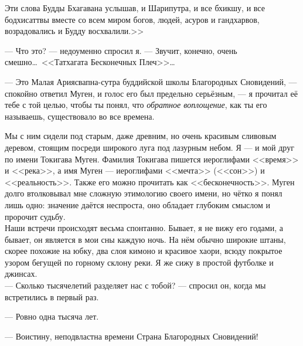 \documentclass[openany, oneside]{book}
\begin{document}
Эти слова Будды Бхагавана услышав, и Шарипутра, и все бхикшу, и все бодхисаттвы вместе со всем миром богов, людей, асуров и гандхарвов, возрадовались и Будду восхвалили.>>

--- Что это? --- недоуменно спросил я. --- Звучит, конечно, очень смешно\dots \ <<Татхагата Бесконечных Плеч>>\dots

--- Это Малая Ариясвапна-сутра буддийской школы Благородных Сновидений, --- спокойно ответил Муген, и голос его был предельно серьёзным, --- я прочитал её тебе с той целью, чтобы ты понял, что \textit{обратное воплощение}, как ты его называешь, существовало во все времена.

Мы с ним сидели под старым, даже древним, но очень красивым сливовым деревом, стоящим посреди широкого луга под лазурным небом. Я --- и мой друг по имени Токигава Муген. Фамилия Токигава пишется иероглифами <<время>> и <<река>>, а имя Муген --- иероглифами <<мечта>> (<<сон>>) и <<реальность>>. Также его можно прочитать как <<бесконечность>>. Муген долго втолковывал мне сложную этимологию своего имени, но чётко я понял лишь одно: значение даётся неспроста, оно обладает глубоким смыслом и пророчит судьбу.\\

Наши встречи происходят весьма спонтанно. Бывает, я не вижу его годами, а бывает, он является в мои сны каждую ночь. На нём обычно широкие штаны, скорее похожие на юбку, два слоя кимоно и красивое хаори, всюду покрытое узором бегущей по горному склону реки. Я же сижу в простой футболке и джинсах.\\

--- Сколько тысячелетий разделяет нас с тобой? --- спросил он, когда мы встретились в первый раз.

--- Ровно одна тысяча лет.

--- Воистину, неподвластна времени Страна Благородных Сновидений!\\
\end{document}
